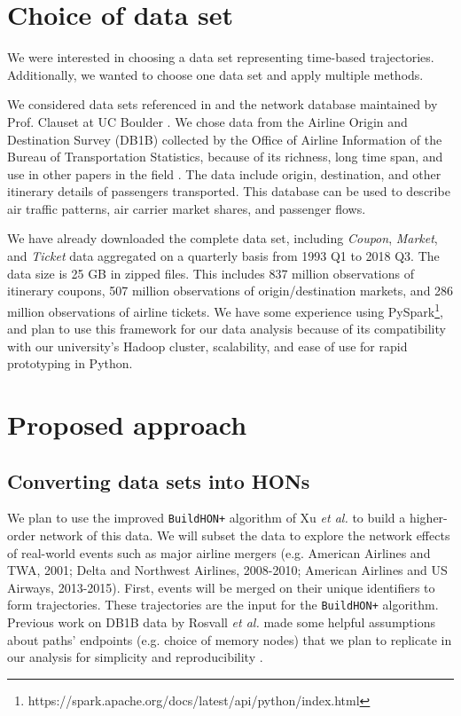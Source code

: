 \documentclass[sigconf]{acmart}
\begin{document}
\section{Choice of data set}
We were interested in choosing a data set representing time-based trajectories. Additionally, we wanted to choose one data set and apply multiple methods.

We considered data sets referenced in \cite{Scholtes2017} and the network database maintained by Prof. Clauset at UC Boulder \cite{Clauset2016}. We chose data from the Airline Origin and Destination Survey (DB1B) collected by the Office of Airline Information of the Bureau of Transportation Statistics, because of its richness, long time span, and use in other papers in the field \cite{AirlineData}. The data include origin, destination, and other itinerary details of passengers transported. This database can be used to describe air traffic patterns, air carrier market shares, and passenger flows.

We have already downloaded the complete data set, including \textit{Coupon}, \textit{Market}, and \textit{Ticket} data aggregated on a quarterly basis from 1993 Q1 to 2018 Q3. The data size is 25 GB in zipped files. This includes 837 million observations of itinerary coupons, 507 million observations of origin/destination markets, and 286 million observations of airline tickets. We have some experience using PySpark\footnote{https://spark.apache.org/docs/latest/api/python/index.html}, and plan to use this framework for our data analysis because of its compatibility with our university's Hadoop cluster, scalability, and ease of use for rapid prototyping in Python.

\section{Proposed approach}

\subsection{Converting data sets into HONs}
We plan to use the improved \texttt{BuildHON+} algorithm of Xu \textit{et al.} \cite{Xu2017} to build a higher-order network of this data. We will subset the data to explore the network effects of real-world events such as major airline mergers (e.g. American Airlines and TWA, 2001; Delta and Northwest Airlines, 2008-2010; American Airlines and US Airways, 2013-2015). First, events will be merged on their unique identifiers to form trajectories. These trajectories are the input for the \texttt{BuildHON+} algorithm. Previous work on DB1B data by Rosvall \textit{et al.} made some helpful assumptions about paths' endpoints (e.g. choice of memory nodes) that we plan to replicate in our analysis for simplicity and reproducibility \cite{Rosvall2014}.
\end{document}
